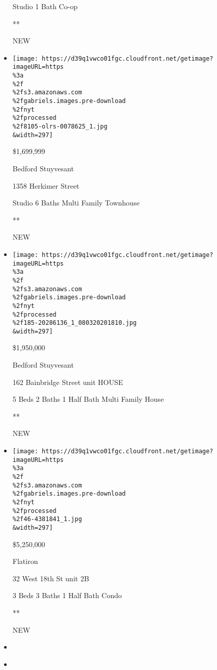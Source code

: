 \begin{itemize}
  Studio \textbar{} 1 Bath \textbar{} Co-op

  **

  NEW
\item
  \href{/real-estate/usa/ny/brooklyn/bedford-stuyvesant/homes-for-sale/1358-herkimer-street/8105-OLRS-0078625?}{}

  \texttt{[image: https://d39q1vwco01fgc.cloudfront.net/getimage?imageURL=https\\\%3a\\\%2f\\\%2fs3.amazonaws.com\\\%2fgabriels.images.pre-download\\\%2fnyt\\\%2fprocessed\\\%2f8105-olrs-0078625\_1.jpg\\\&width=297]}

  \$1,699,999

  Bedford Stuyvesant

  1358 Herkimer Street

  Studio \textbar{} 6 Baths \textbar{} Multi Family Townhouse

  **

  NEW
\item
  \href{/real-estate/usa/ny/brooklyn/bedford-stuyvesant/homes-for-sale/162-bainbridge-street/185-20286136?}{}

  \texttt{[image: https://d39q1vwco01fgc.cloudfront.net/getimage?imageURL=https\\\%3a\\\%2f\\\%2fs3.amazonaws.com\\\%2fgabriels.images.pre-download\\\%2fnyt\\\%2fprocessed\\\%2f185-20286136\_1\_080320201810.jpg\\\&width=297]}

  \$1,950,000

  Bedford Stuyvesant

  162 Bainbridge Street unit HOUSE

  5 Beds \textbar{} 2 Baths \textbar{} 1 Half Bath \textbar{} Multi
  Family House

  **

  NEW
\item
  \href{/real-estate/usa/ny/new-york/flatiron/homes-for-sale/32-west-18th-st/46-4381841?}{}

  \texttt{[image: https://d39q1vwco01fgc.cloudfront.net/getimage?imageURL=https\\\%3a\\\%2f\\\%2fs3.amazonaws.com\\\%2fgabriels.images.pre-download\\\%2fnyt\\\%2fprocessed\\\%2f46-4381841\_1.jpg\\\&width=297]}

  \$5,250,000

  Flatiron

  32 West 18th St unit 2B

  3 Beds \textbar{} 3 Baths \textbar{} 1 Half Bath \textbar{} Condo

  **

  NEW
\item
\item
  \href{/real-estate/usa/ny/new-york/flatiron/homes-for-sale/280-park-avenue-south/16000-RPLU-6420186129?}{}


\end{itemize}
